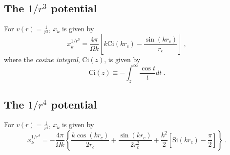 \subsection*{The $1/r^3$ potential}
For $v(r) = \frac{1}{r^3}$, $x_k$ is given by
\begin{equation}
x_k^{1/r^3} = \frac{4\pi}{\Omega k} 
\left[k\text{Ci}(k r_c) - \frac{\sin(k r_c)}{r_c} \right]\:,
\end{equation}
where the {\em cosine integral}, $\text{Ci}(z)$, is given by
\begin{equation}
\text{Ci}(z) \equiv -\int_z^\infty \frac{\cos t}{t} dt\:.
\end{equation}

\subsection*{The $1/r^4$ potential}
For $v(r) = \frac{1}{r^4}$, $x_k$ is given by
\begin{equation}
x_k^{1/r^4} = -\frac{4 \pi}{\Omega k} 
\left\{
\frac{k \cos(k r_c)}{2 r_c} + \frac{\sin(k r_c)}{2r_c^2} + \frac{k^2}{2} \left[ \text{Si}(k r_c) - \frac{\pi}{2}\right]\right\}\:.
\end{equation}


